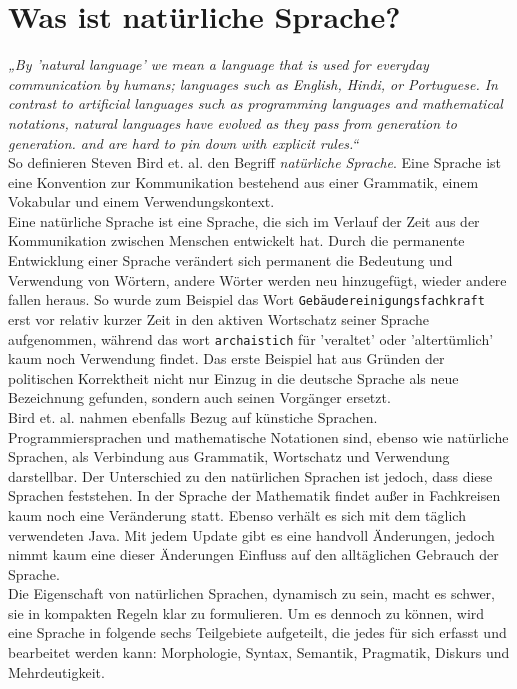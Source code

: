 \documentclass[12pt,twoside]{article}
\theoremstyle{plain}
\theoremstyle{definition}
\theoremstyle{remark}
\begin{document}
\section{Was ist natürliche Sprache?}
\label{sec:def_lang}
\textit{„By 'natural language' we mean a language that is used for everyday communication by humans; languages such as English, Hindi, or Portuguese.
        In contrast to artificial languages such as programming languages and mathematical notations, natural languages have evolved as they pass from generation to generation.
        and are hard to pin down with explicit rules.“} \cite{Bird2009}\\
So definieren Steven Bird et. al. den Begriff \textit{natürliche Sprache}.
Eine Sprache ist eine Konvention zur Kommunikation bestehend aus einer Grammatik, einem Vokabular und einem Verwendungskontext. \\
Eine natürliche Sprache ist eine Sprache, die sich im Verlauf der Zeit aus der Kommunikation zwischen Menschen entwickelt hat.
Durch die permanente Entwicklung einer Sprache verändert sich permanent die Bedeutung und Verwendung von Wörtern, andere Wörter werden neu hinzugefügt, wieder andere fallen heraus.
So wurde zum Beispiel das Wort \texttt{Gebäudereinigungsfachkraft} erst vor relativ kurzer Zeit in den aktiven Wortschatz seiner Sprache aufgenommen, während das wort \texttt{archaistich} für 'veraltet' oder 'altertümlich' kaum noch Verwendung findet.
Das erste Beispiel hat aus Gründen der politischen Korrektheit nicht nur Einzug in die deutsche Sprache als neue Bezeichnung gefunden, sondern auch seinen Vorgänger ersetzt.\\
Bird et. al. nahmen ebenfalls Bezug auf künstiche Sprachen.
Programmiersprachen und mathematische Notationen sind, ebenso wie natürliche Sprachen, als Verbindung aus Grammatik, Wortschatz und Verwendung darstellbar.
Der Unterschied zu den natürlichen Sprachen ist jedoch, dass diese Sprachen feststehen.
In der Sprache der Mathematik findet außer in Fachkreisen kaum noch eine Veränderung statt.
Ebenso verhält es sich mit dem täglich verwendeten Java.
Mit jedem Update gibt es eine handvoll Änderungen, jedoch nimmt kaum eine dieser Änderungen Einfluss auf den alltäglichen Gebrauch der Sprache.\\
Die Eigenschaft von natürlichen Sprachen, dynamisch zu sein, macht es schwer, sie in kompakten Regeln klar zu formulieren.
Um es dennoch zu können, wird eine Sprache in folgende sechs Teilgebiete aufgeteilt, die jedes für sich erfasst und bearbeitet werden kann:
Morphologie, Syntax, Semantik, Pragmatik, Diskurs und Mehrdeutigkeit.\\
\end{document}
